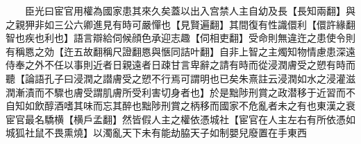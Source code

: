 　　臣光曰宦官用權為國家患其來久矣蓋以出入宫禁人主自幼及長【長知兩翻】與之親狎非如三公六卿進見有時可嚴憚也【見賢遍翻】其間復有性識儇利【儇許緣翻智也疾也利也】語言辯給伺候顔色承迎志趣【伺相吏翻】受命則無違迕之患使令則有稱㥦之効【迕五故翻稱尺證翻㥦與愜同詰叶翻】自非上智之主燭知物情慮患深遠侍奉之外不任以事則近者日親遠者日疎甘言卑辭之請有時而從浸潤膚受之愬有時而聽【論語孔子曰浸潤之譛膚受之愬不行焉可謂明也已矣朱熹註云浸潤如水之浸灌滋潤漸漬而不驟也膚受謂肌膚所受利害切身者也】於是黜陟刑賞之政潜移于近習而不自知如飲醇酒嗜其味而忘其醉也黜陟刑賞之柄移而國家不危亂者未之有也東漢之衰宦官最名驕横【横戶孟翻】然皆假人主之權依憑城社【宦官在人主左右有所依憑如城狐社鼠不畏熏燒】以濁亂天下未有能劫脇天子如制嬰兒廢置在手東西